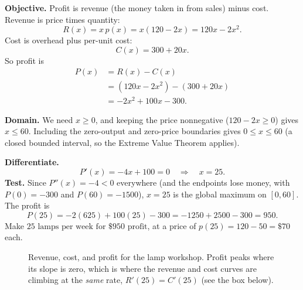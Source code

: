 \textbf{Objective.} Profit is revenue (the money taken in from sales) minus cost.
Revenue is price times quantity:
\[
R(x) = x\,p(x) = x(120 - 2x) = 120x - 2x^2.
\]
Cost is overhead plus per-unit cost:
\[
C(x) = 300 + 20x.
\]
So profit is
\begin{align*}
P(x) &= R(x) - C(x)\\
     &= (120x - 2x^2) - (300 + 20x)\\
     &= -2x^2 + 100x - 300.
\end{align*}

\textbf{Domain.} We need $x\ge 0$, and keeping the price nonnegative ($120-2x\ge 0$)
gives $x\le 60$. Including the zero-output and zero-price boundaries gives $0 \le x \le 60$
(a closed bounded interval, so the Extreme Value Theorem applies).

\textbf{Differentiate.}
\[
P'(x) = -4x + 100 = 0 \quad\Longrightarrow\quad x = 25.
\]
\textbf{Test.} Since $P''(x) = -4 < 0$ everywhere (and the endpoints lose money, with
$P(0)=-300$ and $P(60)=-1500$), $x=25$ is the global maximum on $[0,60]$. The profit is
\[
P(25) = -2(625) + 100(25) - 300 = -1250 + 2500 - 300 = 950.
\]
Make $\boxed{25\text{ lamps per week for \$950 profit}}$, at a price of
$p(25) = 120 - 50 = \$70$ each.

\begin{figure}[H]
\centering
{}
\caption{Revenue, cost, and profit for the lamp workshop. Profit peaks where its slope
is zero, which is where the revenue and cost curves are climbing at
the \emph{same} rate, $R'(25)=C'(25)$ (see the box below).}
\label{ch17:fig-profit}
\end{figure}

